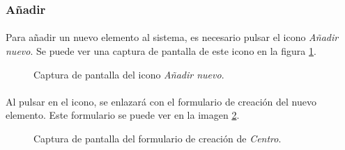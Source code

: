 \subsubsection{Añadir}

  \paragraph{}Para añadir un nuevo elemento al sistema, es necesario pulsar el
  icono \textit{Añadir nuevo}. Se puede ver una captura de pantalla de este
  icono en la figura \ref{capturaAddElemento}.

  \begin{figure}[!ht]
    \begin{center}
      \caption{Captura de pantalla del icono \textit{Añadir nuevo}.}
      \label{capturaAddElemento}
    \end{center}
  \end{figure}

  \paragraph{}Al pulsar en el icono, se enlazará con el formulario de creación
  del nuevo elemento. Este formulario se puede ver en la imagen
  \ref{capturaAddCentro}.

  \begin{figure}[!ht]
    \begin{center}
      \caption{Captura de pantalla del formulario de creación de \textit{Centro}.}
      \label{capturaAddCentro}
    \end{center}
  \end{figure}


